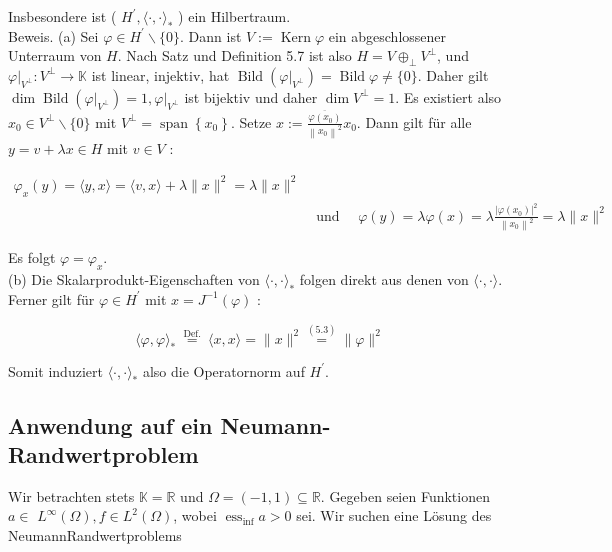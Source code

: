 \documentclass[10pt, letterpaper]{article}
\begin{document}
Insbesondere ist ( $H^{\prime},\langle\cdot, \cdot\rangle_{*}$ ) ein Hilbertraum.\\
Beweis. (a) Sei $\varphi \in H^{\prime} \backslash\{0\}$. Dann ist $V:=\operatorname{Kern} \varphi$ ein abgeschlossener Unterraum von $H$. Nach Satz und Definition 5.7 ist also $H=V \oplus_{\perp} V^{\perp}$, und $\left.\varphi\right|_{V^{\perp}}: V^{\perp} \rightarrow \mathbb{K}$ ist linear, injektiv, hat $\operatorname{Bild}\left(\left.\varphi\right|_{V^{\perp}}\right)=\operatorname{Bild} \varphi \neq\{0\}$. Daher gilt $\operatorname{dim} \operatorname{Bild}\left(\left.\varphi\right|_{V^{\perp}}\right)=1,\left.\varphi\right|_{V^{\perp}}$ ist bijektiv und daher $\operatorname{dim} V^{\perp}=1$. Es existiert also $x_{0} \in V^{\perp} \backslash\{0\}$ mit $V^{\perp}=\operatorname{span}\left\{x_{0}\right\}$. Setze $x:=\frac{\overline{\varphi\left(x_{0}\right)}}{\left\|x_{0}\right\|^{2}} x_{0}$. Dann gilt für alle $y=v+\lambda x \in H$ mit $v \in V$ :

$$
\begin{aligned}
\varphi_{x}(y)=\langle y, x\rangle=\langle v, x\rangle+\lambda\|x\|^{2}=\lambda\|x\|^{2} & \\
& \text { und } \quad \varphi(y)=\lambda \varphi(x)=\lambda \frac{\left|\varphi\left(x_{0}\right)\right|^{2}}{\left\|x_{0}\right\|^{2}}=\lambda\|x\|^{2}
\end{aligned}
$$

Es folgt $\varphi=\varphi_{x}$.\\
(b) Die Skalarprodukt-Eigenschaften von $\langle\cdot, \cdot\rangle_{*}$ folgen direkt aus denen von $\langle\cdot, \cdot\rangle$. Ferner gilt für $\varphi \in H^{\prime}$ mit $x=J^{-1}(\varphi)$ :

$$
\langle\varphi, \varphi\rangle_{*} \stackrel{\text { Def. }}{=}\langle x, x\rangle=\|x\|^{2} \stackrel{(5.3)}{=}\|\varphi\|^{2}
$$

Somit induziert $\langle\cdot, \cdot\rangle_{*}$ also die Operatornorm auf $H^{\prime}$.

\subsection*{Anwendung auf ein Neumann-Randwertproblem}
Wir betrachten stets $\mathbb{K}=\mathbb{R}$ und $\Omega=(-1,1) \subseteq \mathbb{R}$. Gegeben seien Funktionen $a \in$ $L^{\infty}(\Omega), f \in L^{2}(\Omega)$, wobei $\operatorname{ess}_{\inf } a>0$ sei. Wir suchen eine Lösung des NeumannRandwertproblems
\end{document}
